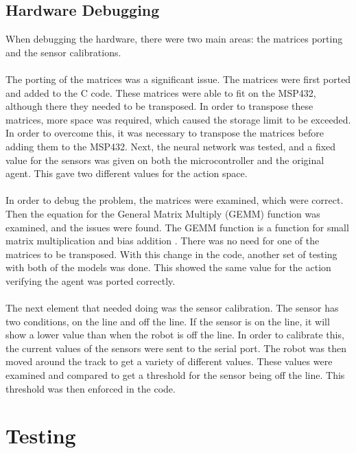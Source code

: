 \documentclass[a4paper,12pt]{article}
\begin{document}
\subsection{Hardware Debugging}
When debugging the hardware, there were two main areas: the matrices porting and the sensor calibrations. 
\\\\
The porting of the matrices was a significant issue. The matrices were first ported and added to the C code. These matrices were able to fit on the MSP432, although there they needed to be transposed. In order to transpose these matrices, more space was required, which caused the storage limit to be exceeded. In order to overcome this, it was necessary to transpose the matrices before adding them to the MSP432. Next, the neural network was tested, and a fixed value for the sensors was given on both the microcontroller and the original agent. This gave two different values for the action space. 
\\\\
In order to debug the problem, the matrices were examined, which were correct. Then the equation for the General Matrix Multiply (GEMM) function was examined, and the issues were found. The GEMM function is a function for small matrix multiplication and bias addition \cite{jhurani2015gemm}. There was no need for one of the matrices to be transposed. With this change in the code, another set of testing with both of the models was done. This showed the same value for the action verifying the agent was ported correctly. 
\\\\
The next element that needed doing was the sensor calibration. The sensor has two conditions, on the line and off the line. If the sensor is on the line, it will show a lower value than when the robot is off the line. In order to calibrate this, the current values of the sensors were sent to the serial port. The robot was then moved around the track to get a variety of different values. These values were examined and compared to get a threshold for the sensor being off the line. This threshold was then enforced in the code. 

\section{Testing}
\end{document}
